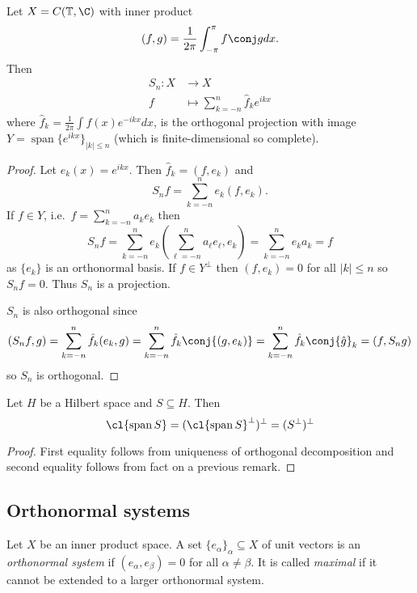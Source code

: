 \documentclass[a4paper]{article}
\DeclareMathOperator{\spans}{span} %
\begin{document}
\begin{eg}
  Let \(X = C(\mathbb T, \C)\) with inner product
  \[
    (f, g) = \frac{1}{2\pi} \int_{-\pi}^\pi f \conj g dx.
  \]
  Then
  \begin{align*}
    S_n: X &\to X \\
    f &\mapsto \sum_{k = -n}^n \hat f_k e^{ikx}
  \end{align*}
  where \(\hat f_k = \frac{1}{2\pi} \int f(x) e^{-ikx} dx\), is the orthogonal projection with image \(Y = \spans \{e^{ikx}\}_{|k| \leq n}\) (which is finite-dimensional so complete).

  \begin{proof}
    Let \(e_k(x) = e^{ikx}\). Then \(\hat f_k = (f, e_k)\) and
    \[
      S_nf = \sum_{k = -n}^n e_k (f, e_k).
    \]
    If \(f \in Y\), i.e.\ \(f = \sum_{k = -n}^n a_ke_k\) then
    \[
      S_nf
      = \sum_{k = -n}^n e_k ( \sum_{\ell = -n}^n a_\ell e_\ell, e_k )
      = \sum_{k = -n}^n e_k a_k
      = f
    \]
    as \(\{e_k\}\) is an orthonormal basis. If \(f \in Y^\perp\) then \((f, e_k) = 0\) for all \(|k| \leq n\) so \(S_nf = 0\). Thus \(S_n\) is a projection.

    \(S_n\) is also orthogonal since
    \[
      (S_nf, g) = \sum_{k = -n}^n \hat f_k (e_k, g)
      = \sum_{k = -n}^n \hat f_k \conj{(g, e_k)}
      = \sum_{k = -n}^n \hat f_k \conj{\hat g}_k
      = (f, S_ng)
    \]
    so \(S_n\) is orthogonal.
  \end{proof}
\end{eg}

\begin{corollary}
  Let \(H\) be a Hilbert space and \(S \subseteq H\). Then
  \[
    \cl{\spans S}
    = (\cl{\spans S}^\perp)^\perp
    = (S^\perp)^\perp
  \]
\end{corollary}

\begin{proof}
  First equality follows from uniqueness of orthogonal decomposition and second equality follows from fact on a previous remark. %
\end{proof}

\subsection{Orthonormal systems}

\begin{definition}
  Let \(X\) be an inner product space. A set \(\{e_\alpha\}_\alpha \subseteq X\) of unit vectors is an \emph{orthonormal system} if \((e_\alpha, e_\beta) = 0\) for all \(\alpha \neq \beta\). It is called \emph{maximal} if it cannot be extended to a larger orthonormal system.
\end{definition}
\end{document}
